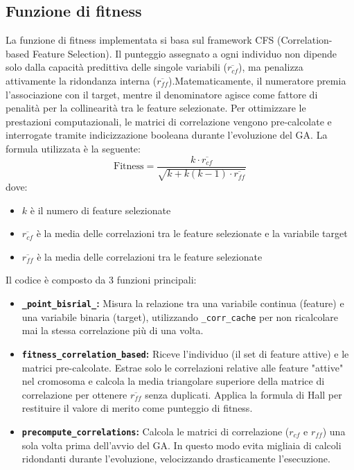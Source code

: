 \documentclass[11pt,a4paper]{article}
\begin{document}
\subsection{Funzione di fitness}
La funzione di fitness implementata si basa sul framework CFS (Correlation-based Feature Selection). Il punteggio assegnato a ogni individuo non dipende solo dalla capacità predittiva delle singole variabili ($\overline{r_{cf}}$), ma penalizza attivamente la ridondanza interna ($\overline{r_{ff}}$).Matematicamente, il numeratore premia l'associazione con il target, mentre il denominatore agisce come fattore di penalità per la collinearità tra le feature selezionate. Per ottimizzare le prestazioni computazionali, le matrici di correlazione vengono pre-calcolate e interrogate tramite indicizzazione booleana durante l'evoluzione del GA.
La formula utilizzata è la seguente:
\begin{equation}
\text{Fitness} = \frac{k \cdot \overline{r_{cf}}}{\sqrt{k + k(k-1) \cdot \overline{r_{ff}}}}
\end{equation}
dove:
\begin{itemize}
  \item $k$ è il numero di feature selezionate
  \item $\overline{r_{cf}}$ è la media delle correlazioni tra le feature selezionate e la variabile target
  \item $\overline{r_{ff}}$ è la media delle correlazioni tra le feature selezionate
\end{itemize}
Il codice è composto da 3 funzioni principali:
\begin{itemize}
  \item \textbf{\texttt{\_point\_bisrial\_}:} Misura la relazione tra una variabile continua (feature) e una variabile binaria (target), utilizzando \texttt{\_corr\_cache} per non ricalcolare mai la stessa correlazione più di una volta.
  \item \textbf{\texttt{fitness\_correlation\_based}:}  Riceve l'individuo (il set di feature attive) e le matrici pre-calcolate. Estrae solo le correlazioni relative alle feature "attive" nel cromosoma e calcola la media triangolare superiore della matrice di correlazione per ottenere $\overline{r_{ff}}$ senza duplicati. Applica la formula di Hall per restituire il valore di merito come punteggio di fitness.
  \item \textbf{\texttt{precompute\_correlations}:} Calcola le matrici di correlazione ($r_{cf}$ e $r_{ff}$) una sola volta prima dell'avvio del GA. In questo modo evita migliaia di calcoli ridondanti durante l'evoluzione, velocizzando drasticamente l'esecuzione.
\end{itemize}
\end{document}
